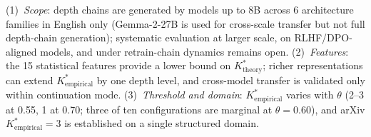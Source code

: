 \documentclass[11pt]{article}
\newcommand{\Kempirical}{{K^*_{\text{empirical}}}}
\newcommand{\Ktheory}{{K^*_{\text{theory}}}}
\begin{document}
(1)~\emph{Scope}: depth chains are generated by models up to 8B across 6 architecture families in English only (Gemma-2-27B is used for cross-scale transfer but not full depth-chain generation); systematic evaluation at larger scale, on RLHF/DPO-aligned models, and under retrain-chain dynamics remains open.
(2)~\emph{Features}: the 15 statistical features provide a lower bound on $\Ktheory$; richer representations can extend $\Kempirical$ by one depth level, and cross-model transfer is validated only within continuation mode.
(3)~\emph{Threshold and domain}: $\Kempirical$ varies with $\theta$ (2--3 at 0.55, 1 at 0.70; three of ten configurations are marginal at $\theta{=}0.60$), and arXiv $\Kempirical{=}3$ is established on a single structured domain.



\clearpage


\end{document}
